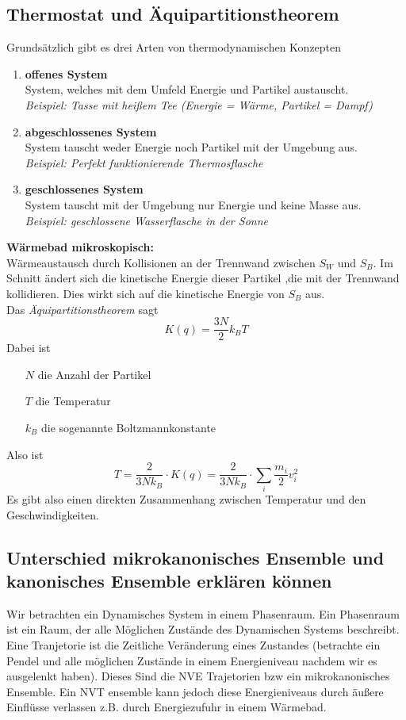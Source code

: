 \documentclass[]{article}
\begin{document}
\subsection*{Thermostat und Äquipartitionstheorem}
Grundsätzlich gibt es drei Arten von thermodynamischen Konzepten
\begin{enumerate}
	\item \textbf{offenes System}\\
	System, welches mit dem Umfeld Energie und Partikel austauscht. \\
	\textit{Beispiel: Tasse mit heißem Tee (Energie = Wärme, Partikel = Dampf)}
	\item \textbf{abgeschlossenes System}\\
	System tauscht weder Energie noch Partikel mit der Umgebung aus. \\
	\textit{Beispiel: Perfekt funktionierende Thermosflasche}
	\item \textbf{geschlossenes System}\\
	System tauscht mit der Umgebung nur Energie und keine Masse aus. \\
	\textit{Beispiel: geschlossene Wasserflasche in der Sonne}
\end{enumerate}
\textbf{Wärmebad mikroskopisch:}\\
Wärmeaustausch durch Kollisionen an der Trennwand zwischen $S_W$ und $S_B$. Im Schnitt ändert sich die kinetische Energie dieser Partikel ,die mit der Trennwand kollidieren. Dies wirkt sich auf die kinetische Energie von $S_B$ aus. \\
Das \textit{Äquipartitionstheorem} sagt
\begin{equation*}
K(q) = \frac{3 N}{2} k_B T
\end{equation*}
Dabei ist
\begin{itemize}
	\item[$N$] die Anzahl der Partikel
	\item[$T$] die Temperatur
	\item[$k_B$] die sogenannte Boltzmannkonstante
\end{itemize}
Also ist 
\begin{equation*}
T = \frac{2}{3 N k_B} \cdot K(q) = \frac{2}{3 N k_B} \cdot \sum_i \frac{m_i}{2} v_i^2
\end{equation*}
Es gibt also einen direkten Zusammenhang zwischen Temperatur und den Geschwindigkeiten.

\subsection*{Unterschied mikrokanonisches Ensemble und kanonisches Ensemble erklären können}
Wir betrachten ein Dynamisches System in einem Phasenraum. Ein Phasenraum ist ein Raum, der alle Möglichen Zustände des Dynamischen Systems beschreibt. Eine Tranjetorie ist die Zeitliche Veränderung eines Zustandes (betrachte ein Pendel und alle möglichen Zustände in einem Energieniveau nachdem wir es ausgelenkt haben). Dieses Sind die NVE Trajetorien bzw ein mikrokanonisches Ensemble. Ein NVT ensemble kann jedoch diese Energieniveaus durch äußere Einflüsse verlassen z.B. durch Energiezufuhr in einem Wärmebad. 
\end{document}
